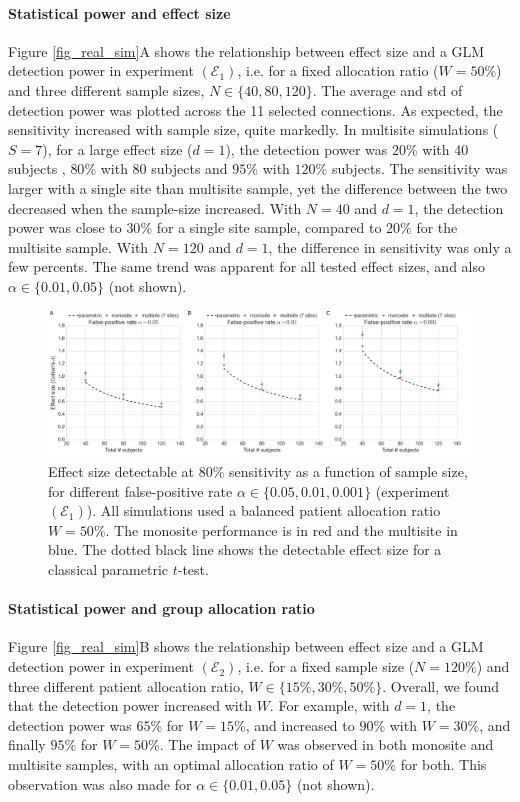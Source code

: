 \documentclass[authoryear]{elsarticle}
\begin{document}
\paragraph{Statistical power and effect size} Figure \ref{fig_real_sim}A shows the relationship between effect size and a GLM detection power in experiment $(\mathcal{E}_1)$, i.e. for a fixed allocation ratio ($W=50\%$) and three different sample sizes, $N\in\{40, 80, 120\}$. The average and std of detection power was plotted across the 11 selected connections. As expected, the sensitivity increased with sample size, quite markedly. In multisite simulations ($S=7$), for a large effect size ($d=1$), the detection power was $20\%$ with 40 subjects , $80\%$ with 80 subjects and $95\%$ with $120\%$ subjects. The sensitivity was larger with a single site than multisite sample, yet the difference between the two decreased when the sample-size increased. With $N=40$ and $d=1$, the detection power was close to $30\%$ for a single site sample, compared to $20\%$ for the multisite sample. With $N=120$ and $d=1$, the difference in sensitivity was only a few percents. The same trend was apparent for all tested effect sizes, and also $\alpha\in\{0.01,0.05\}$ (not shown). 
\par
\begin{figure}[htbp]\centering
\includegraphics[width=\textwidth]{../figures/samplesize_x_effectsize.png}
\caption[]{
Effect size detectable at 80\% sensitivity as a function of sample size, for different false-positive rate $\alpha\in \{0.05,0.01,0.001\}$ (experiment $(\mathcal{E}_1)$). All simulations used a balanced patient allocation ratio $W=50\%$. The monosite performance is in red and the multisite in blue. The dotted black line shows the detectable effect size for a classical parametric $t$-test. 
}
\label{fig_sampeffect_curves_alpha001}
\end{figure}

\paragraph{Statistical power and group allocation ratio} Figure \ref{fig_real_sim}B shows the relationship between effect size and a GLM detection power in experiment $(\mathcal{E}_2)$, i.e. for a fixed sample size ($N=120\%$) and three different patient allocation ratio, $W\in \{15\%, 30\%,50\%\}$. Overall, we found that the detection power increased with $W$. For example, with $d=1$, the detection power was $65\%$ for $W=15\%$, and increased to $90\%$ with $W=30\%$, and finally $95\%$ for $W=50\%$. The impact of $W$ was observed in both monosite and multisite samples, with an optimal allocation ratio of $W=50\%$ for both. This observation was also made for $\alpha\in\{0.01,0.05\}$ (not shown). 
\end{document}
